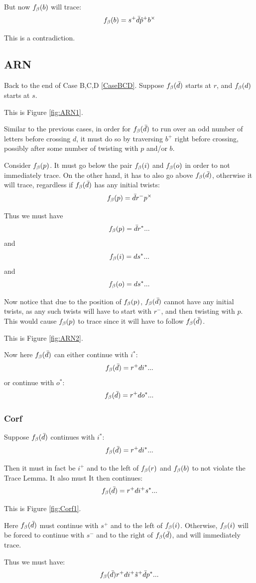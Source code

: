 But now $f_\beta(b)$ will trace:
\[
f_\beta(b) = s^+ \bar{d} \hat{p}^+ b^\times
\]

This is a contradiction.

\subsection{ARN}\label{ARN}
Back to the end of Case B,C,D \ref{CaseBCD}. Suppose $f_\beta(\bar{d})$ starts at $r$, and $f_\beta(d)$ starts at $s$.

This is Figure \ref{fig:ARN1}.

Similar to the previous cases, in order for $f_\beta(\bar{d})$ to run over an odd number of letters before crossing $d$, it must do so by traversing $b^+$ right before crossing, possibly after some number of twisting with $p$ and/or $b$. 

Consider $f_\beta(p)$. It must go below the pair $f_\beta(i)$ and $f_\beta(o)$ in order to not immediately trace. On the other hand, it has to also go above $f_\beta(\bar{d})$, otherwise it will trace, regardless if $f_\beta(\bar{d})$ has any initial twists:
\[
f_\beta(p) = \bar{d} r^- p^\times
\]

Thus we must have
\[
f_\beta(p) = \bar{d} r^*...
\]
and
\[
f_\beta(i) = d s^*...
\]
and
\[
f_\beta(o) = d s^*...
\]


Now notice that due to the position of $f_\beta(p)$, $f_\beta(\bar{d})$ cannot have any initial twists, as any such twists will have to start with $r^-$, and then twisting with $p$. This would cause $f_\beta(p)$ to trace since it will have to follow $f_\beta(\bar{d})$. 

This is Figure \ref{fig:ARN2}.

Now here $f_\beta(\bar{d})$ can either continue with $i^*$:
\[
f_\beta(\bar{d}) = r^+ d i^*...
\]
or continue with $o^*$:
\[
f_\beta(\bar{d}) = r^+ d o^*...
\]

\subsubsection{Corf} \label{Corf}
Suppose $f_\beta(\bar{d})$ continues with $i^*$:
\[
f_\beta(\bar{d}) = r^+ d i^*...
\]

Then it must in fact be $i^+$ and to the left of $f_\beta(r)$ and $f_\beta(b)$ to not violate the Trace Lemma. It also must It then continues:
\[
f_\beta(\bar{d}) = r^+ d i^+ s^*...
\]

This is Figure \ref{fig:Corf1}.

Here $f_\beta(\bar{d})$ must continue with $s^+$ and to the left of $f_\beta(i)$. Otherwise, $f_\beta(i)$ will be forced to continue with $s^-$ and to the right of $f_\beta(\bar{d})$, and will immediately trace.

Thus we must have:
\[
f_\beta(\bar{d}) r^+ d i^+ \hat{s}^+ \bar{d} p^*...
\]

